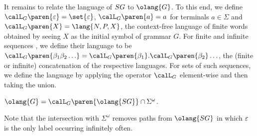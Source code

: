 \documentclass[../../diss.tex]{subfiles}
\begin{document}
It remains to relate the language of $SG$ to $\olang{G}$.
To this end, we define $\calL_G\paren{\eps} = \set{ \eps }$, $\calL_G\paren{a} = a$ for terminals $a \in \Sigma$ and $\calL_G\paren{X} = \lang{N,P,X}$, \ie the context-free language of finite words obtained by seeing $X$ as the initial symbol of grammar $G$.
For finite and infinite sequences , we define their language to be $\calL_G\paren{\beta_1\beta_2 \ldots} = \calL_G\paren{\beta_1}.\calL_G\paren{\beta_2}\ldots$, the (finite or infinite) concatenation of the respective languages.
For sets of such sequences, we define the language by applying the operator $\calL_G$ element-wise and then taking the union.

\begin{lemma}%
\label{Lemma:CFGOmegaLangSpinalGraph}%
    $\olang{G} = \calL_G\paren{\olang{\SpinalGraph}} \cap \Sigma^\omega$.
\end{lemma}

Note that the intersection with $\Sigma^\omega$ removes paths from $\olang{\SpinalGraph}$ in which $\varepsilon$ is the only label occurring infinitely often.
\end{document}
